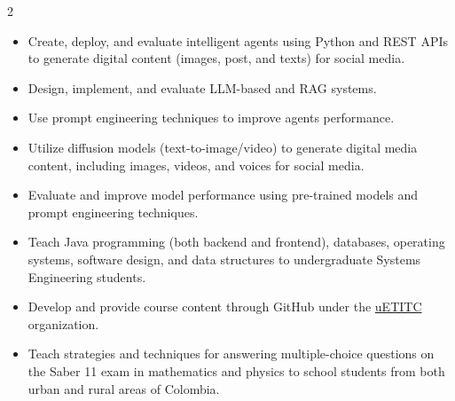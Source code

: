 \documentclass[10pt,legalpaper,ragged2e,withhyper]{altacv}
\begin{document}
\begin{paracol}{2}

\begin{itemize}
	\item Create, deploy, and evaluate intelligent agents using Python and REST APIs to generate digital content (images, post, and texts) for social media.
	\item Design, implement, and evaluate LLM-based and RAG systems.
	\item Use prompt engineering techniques to improve agents performance.
\end{itemize}

\divider


\begin{itemize}
\item Utilize diffusion models (text-to-image/video) to generate digital media content, including images, videos, and voices for social media.
\item Evaluate and improve model performance using pre-trained models and prompt engineering techniques.
\end{itemize}

\divider

\begin{itemize}
\item Teach Java programming (both backend and frontend), databases, operating systems, software design, and data structures to undergraduate Systems Engineering students.
\item Develop and provide course content through GitHub under the \textcolor{teal}{\href{https://github.com/uetitc}{uETITC}} organization.
\end{itemize}
\divider


\begin{itemize}
	\item Teach strategies and techniques for answering multiple-choice questions on the Saber 11 exam in mathematics and physics to school students from both urban and rural areas of Colombia.
	

\end{itemize}
\end{paracol}
\end{document}
